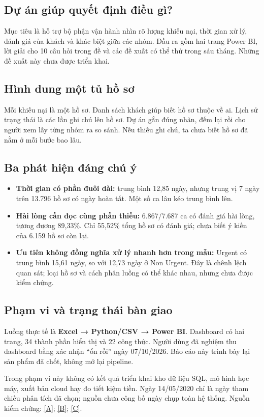 \documentclass[11pt,a4paper]{article}
\newcommand{\evidence}[1]{{\small\color{muted}Nguồn kiểm chứng: #1.}\par}
\newcommand{\src}[2]{\hyperlink{source-index}{[#2]}}
\begin{document}
\subsection*{Dự án giúp quyết định điều gì?}
Mục tiêu là hỗ trợ bộ phận vận hành nhìn rõ lượng khiếu nại, thời gian xử lý, đánh giá của khách và khác biệt giữa các nhóm. Đầu ra gồm hai trang Power BI, lời giải cho 10 câu hỏi trong đề và các đề xuất có thể thử trong sáu tháng. Những đề xuất này chưa được triển khai.

\subsection*{Hình dung một tủ hồ sơ}
Mỗi khiếu nại là một hồ sơ. Danh sách khách giúp biết hồ sơ thuộc về ai. Lịch sử trạng thái là các lần ghi chú lên hồ sơ. Dự án gắn đúng nhãn, đếm lại rồi cho người xem lấy từng nhóm ra so sánh. Nếu thiếu ghi chú, ta chưa biết hồ sơ đã nằm ở mỗi bước bao lâu.

\subsection*{Ba phát hiện đáng chú ý}
\begin{itemize}
\item \textbf{Thời gian có phần đuôi dài:} trung bình 12,85 ngày, nhưng trung vị 7 ngày trên 13.796 hồ sơ có ngày hoàn tất. Một số ca lâu kéo trung bình lên.
\item \textbf{Hài lòng cần đọc cùng phần thiếu:} 6.867/7.687 ca có đánh giá hài lòng, tương đương 89,33\%. Chỉ 55,52\% tổng hồ sơ có đánh giá; chưa biết ý kiến của 6.159 hồ sơ còn lại.
\item \textbf{Ưu tiên không đồng nghĩa xử lý nhanh hơn trong mẫu:} Urgent có trung bình 15,61 ngày, so với 12,73 ngày ở Non Urgent. Đây là chênh lệch quan sát; loại hồ sơ và cách phân luồng có thể khác nhau, nhưng chưa được kiểm chứng.
\end{itemize}

\subsection*{Phạm vi và trạng thái bàn giao}
Luồng thực tế là \textbf{Excel → Python/CSV → Power BI}. Dashboard có hai trang, 34 thành phần hiển thị và 22 công thức. Người dùng đã nghiệm thu dashboard bằng xác nhận “ổn rồi” ngày 07/10/2026. Báo cáo này trình bày lại sản phẩm đã chốt, không mở lại pipeline.

Trong phạm vi này không có kết quả triển khai kho dữ liệu SQL, mô hình học máy, xuất bản cloud hay đo tiết kiệm tiền. Ngày 14/05/2020 chỉ là ngày tham chiếu phân tích đã chọn; nguồn chưa công bố ngày chụp toàn hệ thống.
\evidence{\src{source-analysis}{A}; \src{source-qa}{B}; \src{source-docs}{C}}
\clearpage
\end{document}
